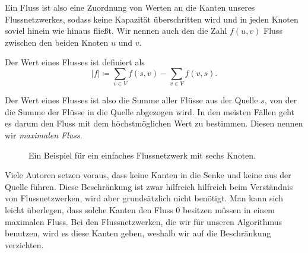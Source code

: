 Ein Fluss ist also eine Zuordnung von Werten an die Kanten unseres Flussnetzwerkes, sodass keine Kapazität überschritten wird und in jeden Knoten soviel hinein wie hinaus fließt. Wir nennen auch den die Zahl $f(u,v)$ Fluss zwischen den beiden Knoten $u$ und $v$.

\begin{definition}
	Der Wert eines Flusses ist definiert als
	\begin{equation}
	|f| \coloneqq \sum_{v \in V}{f(s,v)} - \sum_{v \in V}{f(v,s)}.
	\end{equation} 
\end{definition}

Der Wert eines Flusses ist also die Summe aller Flüsse aus der Quelle $s$, von der die Summe der Flüsse in die Quelle abgezogen wird. In den meisten Fällen geht es darum den Fluss mit dem höchstmöglichen Wert zu bestimmen. Diesen nennen wir \emph{maximalen Fluss}.

\begin{figure}
\begin{center}
\end{center}
\caption{Ein Beispiel für ein einfaches Flussnetzwerk mit sechs Knoten.}
\end{figure}

Viele Autoren setzen voraus, dass keine Kanten in die Senke und keine aus der Quelle führen. Diese Beschränkung ist zwar hilfreich hilfreich beim Verständnis von Flussnetzwerken, wird aber grundsätzlich nicht benötigt. Man kann sich leicht überlegen, dass solche Kanten den Fluss 0 besitzen müssen in einem maximalen Fluss. Bei den Flussnetzwerken, die wir für unseren Algorithmus benutzen, wird es diese Kanten geben, weshalb wir auf die Beschränkung verzichten. 

